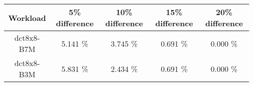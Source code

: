 \begin{tabular}{|c|c|c|c|c|}
\hline
  \textbf{Workload} & \textbf{5\% difference} & \textbf{10\% difference} & \textbf{15\% difference} & \textbf{20\% difference}\\
\hline
\hline
  dct8x8-B7M & 5.141 \% & 3.745 \% & 0.691 \% & 0.000 \%\\
  dct8x8-B3M & 5.831 \% & 2.434 \% & 0.691 \% & 0.000 \%\\
\hline
\end{tabular}
